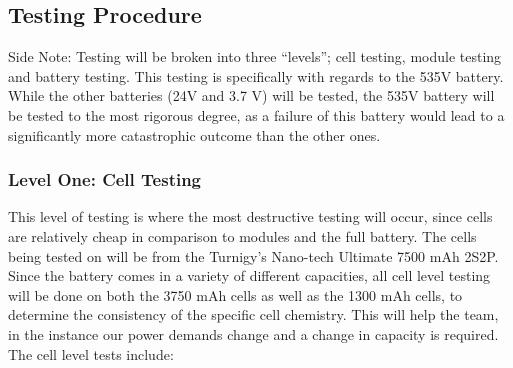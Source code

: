 \documentclass[main.tex]{subfiles}
\begin{document}
    \subsection{Testing Procedure}
    \label{subsec:testing-proc}
    Side Note: Testing will be broken into three “levels”; cell testing, module testing and battery testing. This testing is specifically with regards to the 535V battery. While the other batteries (24V and 3.7 V) will be tested, the 535V battery will be tested to the most rigorous degree, as a failure of this battery would lead to a significantly more catastrophic outcome than the other ones.

    \subsubsection{Level One: Cell Testing}
    This level of testing is where the most destructive testing will occur, since cells are relatively cheap in comparison to modules and the full battery. The cells being tested on will be from the Turnigy’s Nano-tech Ultimate  7500 mAh 2S2P. Since the battery comes in a variety of different capacities, all cell level testing will be done on both the 3750 mAh cells as well as the 1300 mAh cells, to determine the consistency of the specific cell chemistry. This will help the team, in the instance our power demands change and a change in capacity is required. The cell level tests include:
\end{document}
